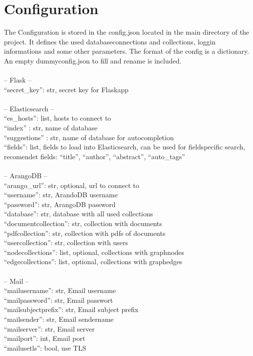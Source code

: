 \section{Configuration}
The Configuration is stored in the config.json located in the main directory of the project. It defines the used databaseconnections and collections, loggin informations and some other parameters. The format of the config is a dictionary. An empty dummyconfig.json to fill and rename is included.\\
\\
-- Flask --\\
``secret\_key'': str, secret key for Flaskapp\\
 \\
-- Elasticsearch --\\
 ``es\_hosts'': list, hosts to connect to\\
 ``index'' : str, name of database\\
 ``suggestions'' : str, name of database for autocompletion\\
 ``fields'': list, fields to load into Elasticsearch, can be used for fieldspecific search, recomendet fields: ``title'', ``author'', ``abstract'', ``auto\_tags''\\
 \\
-- ArangoDB --\\
 ``arango\_url'': str, optional, url to connect to\\
 ``username'': str, ArandoDB username\\
 ``password'': str, ArangoDB password\\
 ``database'': str, database with all used collections\\
 ``documentcollection'': str, collection with documents\\
 ``pdfcollection'': str, collection with pdfs of documents\\
 ``usercollection'':  str, collection with users\\
 ``nodecollections'': list, optional, collections with graphnodes\\
 ``edgecollections'': list, optional, collections with graphedges\\
 \\
-- Mail --\\
 ``mailusername'': str, Email username\\
 ``mailpassword'': str, Email passwort\\
 ``mailsubjectprefix'': str, Email subject prefix\\
 ``mailsender'': str, Email sendername\\
 ``mailserver'': str, Email server\\
 ``mailport'': int, Email port\\
 ``mailusetls'': bool, use TLS\\
